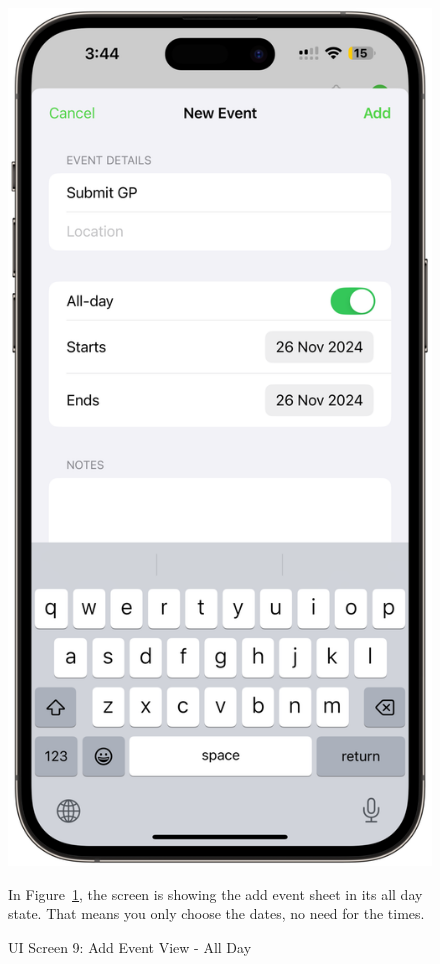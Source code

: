 \begin{figure}[!h]
    \begin{minipage}{0.3\textwidth}
        \centering
        \includegraphics[width=\textwidth]{images/screen9.png}
        \caption{UI Screen 9: Add Event View - All Day}
        \label{fig:ui-screen-9}
    \end{minipage}
    \hfill
    \begin{minipage}{0.65\textwidth}
        In Figure~\ref{fig:ui-screen-9}, the screen is showing the add event sheet in its all day state. That means you only choose the dates, no need for the times.
    \end{minipage}
\end{figure}

